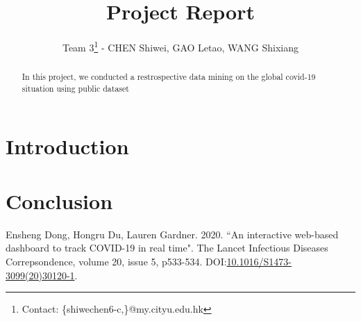 \documentclass{article}
\title{Project Report}
\author{Team 3\footnote{Contact: \{shiwechen6-c,\}@my.cityu.edu.hk}  \:- CHEN Shiwei, GAO Letao, WANG Shixiang}
\begin{document}
\maketitle

\begin{abstract}
    In this project, we conducted a restrospective data mining on the global covid-19 situation using public dataset
\end{abstract}

\section{Introduction}
\section{Conclusion}

\begin{thebibliography}{00}
     Ensheng Dong, Hongru Du, Lauren Gardner. 2020. ``An interactive web-based dashboard to track COVID-19 in real time". The Lancet Infectious Diseases Correpsondence, volume 20, issue 5, p533-534. DOI:\href{https://doi.org/10.1016/S1473-3099(20)30120-1}{10.1016/S1473-3099(20)30120-1}.
\end{thebibliography}
\end{document}
